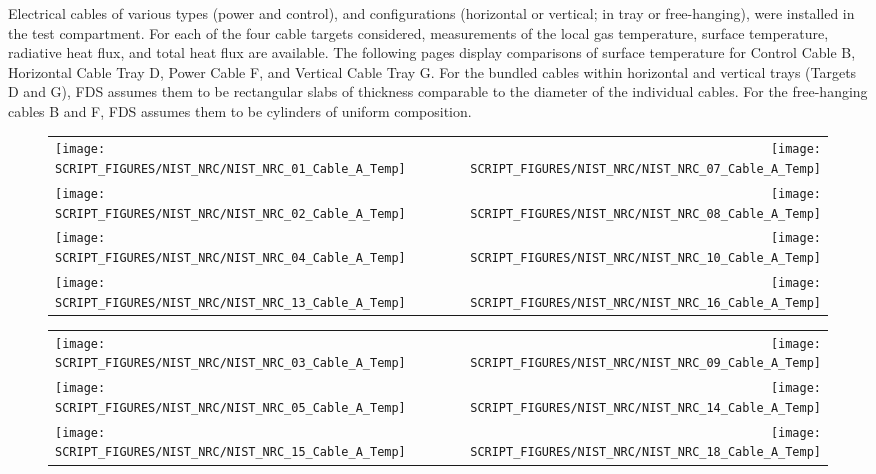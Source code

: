 Electrical cables of various types (power and control), and configurations (horizontal or vertical; in tray or free-hanging), were installed in the test compartment. For each of the four cable targets considered, measurements of the local gas temperature, surface temperature, radiative heat flux, and total heat flux are available.  The following pages display comparisons of surface temperature for Control Cable B, Horizontal Cable Tray D, Power Cable F, and Vertical Cable Tray G. For the bundled cables within horizontal and vertical trays (Targets D and G), FDS assumes them to be rectangular slabs of thickness comparable to the diameter of the individual cables. For the free-hanging cables B and F, FDS assumes them to be cylinders of uniform composition.

\newpage

\begin{figure}[p]
\begin{tabular*}{\textwidth}{l@{\extracolsep{\fill}}r}
\texttt{[image: SCRIPT\_FIGURES/NIST\_NRC/NIST\_NRC\_01\_Cable\_A\_Temp]} &
\texttt{[image: SCRIPT\_FIGURES/NIST\_NRC/NIST\_NRC\_07\_Cable\_A\_Temp]} \\
\texttt{[image: SCRIPT\_FIGURES/NIST\_NRC/NIST\_NRC\_02\_Cable\_A\_Temp]} &
\texttt{[image: SCRIPT\_FIGURES/NIST\_NRC/NIST\_NRC\_08\_Cable\_A\_Temp]} \\
\texttt{[image: SCRIPT\_FIGURES/NIST\_NRC/NIST\_NRC\_04\_Cable\_A\_Temp]} &
\texttt{[image: SCRIPT\_FIGURES/NIST\_NRC/NIST\_NRC\_10\_Cable\_A\_Temp]} \\
\texttt{[image: SCRIPT\_FIGURES/NIST\_NRC/NIST\_NRC\_13\_Cable\_A\_Temp]} &
\texttt{[image: SCRIPT\_FIGURES/NIST\_NRC/NIST\_NRC\_16\_Cable\_A\_Temp]}
\end{tabular*}
\label{NIST_NRC_Cable_A_Closed}
\end{figure}

\begin{figure}[p]
\begin{tabular*}{\textwidth}{l@{\extracolsep{\fill}}r}
\texttt{[image: SCRIPT\_FIGURES/NIST\_NRC/NIST\_NRC\_03\_Cable\_A\_Temp]} &
\texttt{[image: SCRIPT\_FIGURES/NIST\_NRC/NIST\_NRC\_09\_Cable\_A\_Temp]} \\
\texttt{[image: SCRIPT\_FIGURES/NIST\_NRC/NIST\_NRC\_05\_Cable\_A\_Temp]} &
\texttt{[image: SCRIPT\_FIGURES/NIST\_NRC/NIST\_NRC\_14\_Cable\_A\_Temp]} \\
\texttt{[image: SCRIPT\_FIGURES/NIST\_NRC/NIST\_NRC\_15\_Cable\_A\_Temp]} &
\texttt{[image: SCRIPT\_FIGURES/NIST\_NRC/NIST\_NRC\_18\_Cable\_A\_Temp]}
\end{tabular*}
\label{NIST_NRC_Cable_A_Open}
\end{figure}


